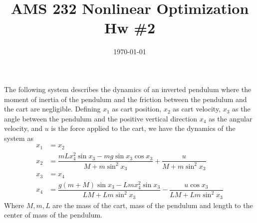 \documentclass[10pt]{article}
\begin{document}
    \title{AMS 232 Nonlinear Optimization Hw \#2}
    \author{}
    \date{\today}
    \maketitle

The following system describes the dynamics of an inverted pendulum where the moment of inertia of the pendulum and the friction between the pendulum and the cart are negligible.  Defining $x_1$ as cart position, $x_2$ as cart velocity, $x_3$ as the angle between the pendulum and the positive vertical direction $x_4$ as the angular velocity, and $u$ is the force applied to the cart, we have the dynamics of the system as
      \begin{align}
         x_1 &= x_2 \\
         x_2 &= \dfrac{mLx_4^2\sin x_3-mg\sin x_3\cos x_3}{M + m\sin^2x_3} + \dfrac{u}{M+m\sin^2x_3} \\
         x_3 &= x_4 \\
         x_4 &= \dfrac{g(m+M)\sin x_3 - Lmx_4^2\sin x_3}{LM+Lm\sin^2x_3} - \dfrac{u\cos x_3}{LM+Lm\sin^2x_3}
      \end{align}
      Where $M, m, L$ are the mass of the cart, mass of the pendulum and length to the center of mass of the pendulum.
\end{document}
